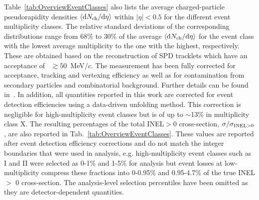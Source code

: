 
Table~\ref{tab:OverviewEventClasses} also lists the average charged-particle pseudorapidity densities $\langle {\rm d }N_{\rm ch}/{\rm d }\eta \rangle$ within $|\eta|<0.5$ for the different event multiplicity classes. The relative standard deviations of the corresponding distributions range from 68\% to 30\% of the average $\langle {\rm d }N_{\rm ch}/{\rm d }\eta \rangle$ for the event class with the lowest average multiplicity to the one with the highest, respectively. These are obtained based on the reconstruction of SPD tracklets which have an acceptance of  \pt~$\gtrsim 50$~MeV/$c$. The measurement has been fully corrected for acceptance, tracking and vertexing efficiency as well as for contamination from secondary particles and combinatorial background. 
 Further details can be found in~\cite{ALICE:2012xs,Adam:2015pza}. In addition, all quantities reported in this work are 
corrected for event detection efficiencies using a data-driven unfolding method. This correction is negligible for high-multiplicity event classes but is of up to $\sim$13\% in multiplicity class X. 
The resulting percentages of the total INEL$>$0 cross-section, $\sigma/\sigma_{\rm INEL>0}$, are also reported in Tab.~\ref{tab:OverviewEventClasses}.
 These values are reported after event detection 
efficiency corrections and do not match the integer boundaries that were used in analysis, e.g. high-multiplicity event classes such as I and II were 
selected as 0-1\% and 1-5\% for analysis but event losses at low-multiplicity compress these fractions into 0-0.95\% and 0.95-4.7\% of the true INEL $>$ 0 cross-section. 
The analysis-level selection percentiles have been omitted as they are detector-dependent quantities.  


